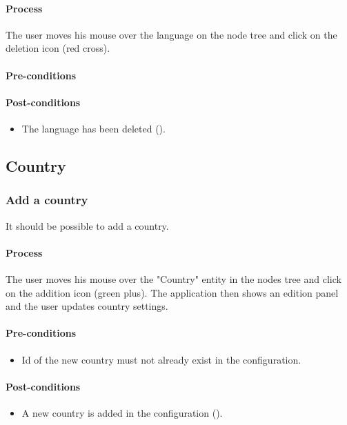 \documentclass[11pt,a4paper,oneside]{article}
\begin{document}
\paragraph{Process}
The user moves his mouse over the language on the node tree and click on the deletion icon (red cross).

\paragraph{Pre-conditions}

\paragraph{Post-conditions}
\begin{itemize}
	\item The language has been deleted ().
\end{itemize}

\subsection{Country}

\subsubsection{Add a country}
It should be possible to add a country.

\paragraph{Process}
The user moves his mouse over the "Country" entity in the nodes tree and click on the addition icon (green plus). The application then shows an edition panel and the user updates country settings.

\paragraph{Pre-conditions}
\begin{itemize}
	\item Id of the new country must not already exist in the configuration.
\end{itemize}

\paragraph{Post-conditions}
\begin{itemize}
	\item A new country is added in the configuration ().
\end{itemize}
\end{document}
